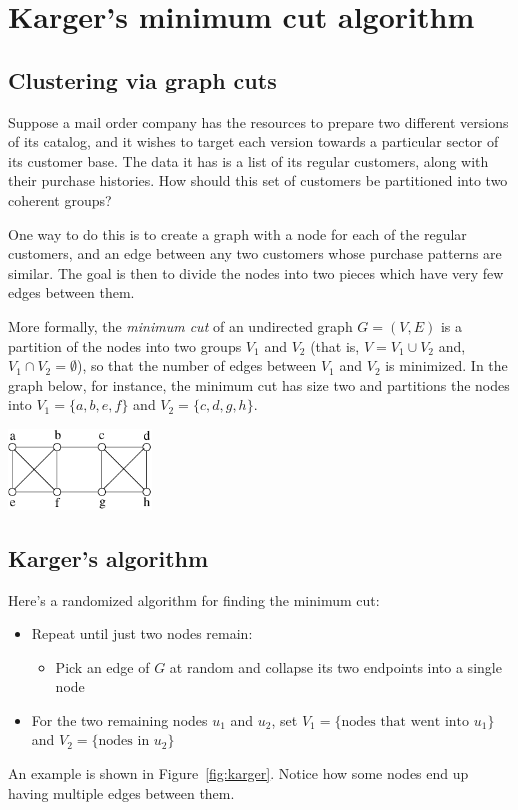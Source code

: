 \section{Karger's minimum cut algorithm}

\subsection{Clustering via graph cuts}

Suppose a mail order company has the resources to prepare two different versions of 
its catalog, and it wishes to target each version towards a particular sector of its 
customer base. The data it has is a list of its regular customers, along with their 
purchase histories. How should this set of customers be partitioned into two coherent 
groups?

One way to do this is to create a graph with a node for each of the regular customers,
and an edge between any two customers whose purchase patterns are similar. The goal is
then to divide the nodes into two pieces which have very few edges between them.

More formally, the {\it minimum cut} of an undirected graph $G = (V,E)$ is a partition
of the nodes into two groups $V_1$ and $V_2$ (that is, $V = V_1 \cup V_2$ and, 
$V_1 \cap V_2 = \emptyset$), so that the number of edges between $V_1$ and $V_2$ is
minimized. In the graph below, for instance, the minimum cut has size two and partitions
the nodes into $V_1 = \{a,b,e,f\}$ and $V_2 = \{c,d,g,h\}$.

\begin{center}
\includegraphics[width=1.5in]{figs/mincut}
\end{center}

\subsection{Karger's algorithm}

Here's a randomized algorithm for finding the minimum cut:

\begin{itemize}
\item Repeat until just two nodes remain:
\begin{itemize}
\item Pick an edge of $G$ at random and collapse its two endpoints into a single node
\end{itemize}
\item For the two remaining nodes $u_1$ and $u_2$, set 
$V_1 = \{\mbox{nodes that went into $u_1$}\}$ and 
$V_2 = \{\mbox{nodes in $u_2$}\}$
\end{itemize}
An example is shown in Figure~\ref{fig:karger}. Notice
how some nodes end up having multiple edges between them.

